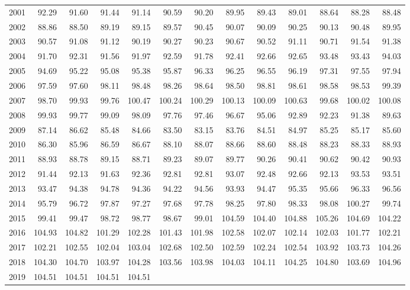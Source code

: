 \begin{longtable}{rrrrrrrrrrrrr}
  2001 & 92.29 & 91.60 & 91.44 & 91.14 & 90.59 & 90.20 & 89.95 & 89.43 & 89.01 & 88.64 & 88.28 & 88.48 \\ 
  2002 & 88.86 & 88.50 & 89.19 & 89.15 & 89.57 & 90.45 & 90.07 & 90.09 & 90.25 & 90.13 & 90.48 & 89.95 \\ 
  2003 & 90.57 & 91.08 & 91.12 & 90.19 & 90.27 & 90.23 & 90.67 & 90.52 & 91.11 & 90.71 & 91.54 & 91.38 \\ 
  2004 & 91.70 & 92.31 & 91.56 & 91.97 & 92.59 & 91.78 & 92.41 & 92.66 & 92.65 & 93.48 & 93.43 & 94.03 \\ 
  2005 & 94.69 & 95.22 & 95.08 & 95.38 & 95.87 & 96.33 & 96.25 & 96.55 & 96.19 & 97.31 & 97.55 & 97.94 \\ 
  2006 & 97.59 & 97.60 & 98.11 & 98.48 & 98.26 & 98.64 & 98.50 & 98.81 & 98.61 & 98.58 & 98.53 & 99.39 \\ 
  2007 & 98.70 & 99.93 & 99.76 & 100.47 & 100.24 & 100.29 & 100.13 & 100.09 & 100.63 & 99.68 & 100.02 & 100.08 \\ 
  2008 & 99.93 & 99.77 & 99.09 & 98.09 & 97.76 & 97.46 & 96.67 & 95.06 & 92.89 & 92.23 & 91.38 & 89.63 \\ 
  2009 & 87.14 & 86.62 & 85.48 & 84.66 & 83.50 & 83.15 & 83.76 & 84.51 & 84.97 & 85.25 & 85.17 & 85.60 \\ 
  2010 & 86.30 & 85.96 & 86.59 & 86.67 & 88.10 & 88.07 & 88.66 & 88.60 & 88.48 & 88.23 & 88.33 & 88.93 \\ 
  2011 & 88.93 & 88.78 & 89.15 & 88.71 & 89.23 & 89.07 & 89.77 & 90.26 & 90.41 & 90.62 & 90.42 & 90.93 \\ 
  2012 & 91.44 & 92.13 & 91.63 & 92.36 & 92.81 & 92.81 & 93.07 & 92.48 & 92.66 & 92.13 & 93.53 & 93.51 \\ 
  2013 & 93.47 & 94.38 & 94.78 & 94.36 & 94.22 & 94.56 & 93.93 & 94.47 & 95.35 & 95.66 & 96.33 & 96.56 \\ 
  2014 & 95.79 & 96.72 & 97.87 & 97.27 & 97.68 & 97.78 & 98.25 & 97.80 & 98.33 & 98.08 & 100.27 & 99.74 \\ 
  2015 & 99.41 & 99.47 & 98.72 & 98.77 & 98.67 & 99.01 & 104.59 & 104.40 & 104.88 & 105.26 & 104.69 & 104.22 \\ 
  2016 & 104.93 & 104.82 & 101.29 & 102.28 & 101.43 & 101.98 & 102.58 & 102.07 & 102.14 & 102.03 & 101.77 & 102.21 \\ 
  2017 & 102.21 & 102.55 & 102.04 & 103.04 & 102.68 & 102.50 & 102.59 & 102.24 & 102.54 & 103.92 & 103.73 & 104.26 \\ 
  2018 & 104.30 & 104.70 & 103.97 & 104.28 & 103.56 & 103.98 & 104.03 & 104.11 & 104.25 & 104.80 & 103.69 & 104.96 \\ 
  2019 & 104.51 & 104.51 & 104.51 & 104.51 &  &  &  &  &  &  &  &  \\ 
   \hline
\hline
\end{longtable}
